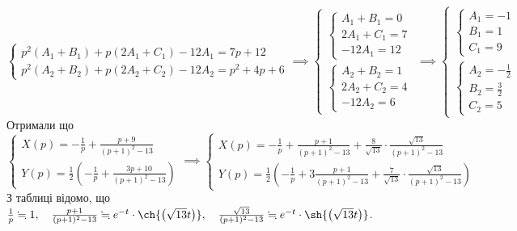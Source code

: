 \documentclass[12 pt]{article}
\begin{document}
$$
\begin{cases}
    p^2(A_1 +B_1 ) + p(2A_1 +C_1 ) -12A_1  = 7p+12 \\ 
    p^2(A_2 +B_2 ) + p(2A_2 +C_2 ) -12A_2  = p^2+4p+6
\end{cases}
\implies
\begin{cases}
    \begin{cases}
        A_1 +B_1 =0 \\ 
        2A_1 +C_1 =7 \\ 
        -12A_1  = 12
    \end{cases} \\ 
    \begin{cases}
        A_2 +B_2  = 1 \\ 
        2A_2  + C_2  = 4 \\ 
        -12 A_2  = 6
    \end{cases}
\end{cases}
\implies
\begin{cases}
    \begin{cases}
        A_1  = -1 \\
        B_1 = 1 \\ 
        C_1 = 9 
    \end{cases} \\ 
    \begin{cases}
        A_2  = -\frac{1}{2}\\
        B_2  = \frac{3}{2} \\ 
        C_2  = 5         
    \end{cases}
\end{cases}
$$
Отримали що $$
\begin{cases}
    X(p) = -\frac{1}{p} + \frac{p+9}{(p+1)^2-13} \\ 
    Y(p) = \frac{1}{2}\left(-\frac{1}{p} + \frac{3p+10}{(p+1)^2-13}\right)
\end{cases} \implies
\begin{cases}
    X(p) = -\frac{1}{p} + \frac{p+1}{(p+1)^2-13} + 
    \frac{8}{ \sqrt{13} }  \cdot  \frac{ \sqrt{13} }{(p+1)^2-13}\\ 
    Y(p) = \frac{1}{2}\left(-\frac{1}{p} + 3\frac{p+1}{(p+1)^2-13} + 
    \frac{7}{ \sqrt{13} } \cdot \frac{ \sqrt{13} }{(p+1)^2-13} \right)
\end{cases}
$$
З таблиці відомо, що $\frac{1}{p} \fallingdotseq 1, \ \ \ 
\frac{p+1}{(p+1)^2-13} \fallingdotseq e^{-t} \cdot \ch{\left(\sqrt{13} t\right)}, \ \ \ 
\frac{ \sqrt{13} }{(p+1)^2-13} \fallingdotseq e^{-t} \cdot \sh{\left(\sqrt{13}t \right)}$. \\ 
\end{document}
